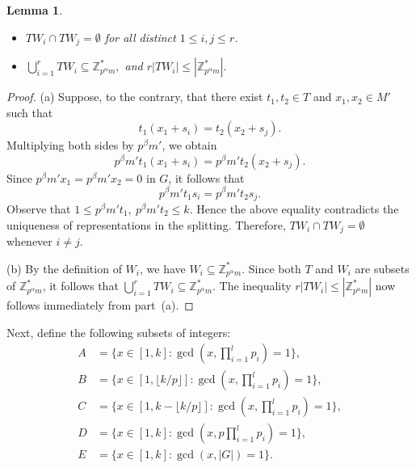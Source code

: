 \documentclass[12pt]{article}
\newtheorem{lemma}[theorem]{Lemma}
\begin{document}
\begin{lemma}\label{lemma--1}
	\begin{itemize}
		\item[(a)] \(TW_i \cap TW_j = \emptyset\) for all distinct \(1 \le i,j \le r\).
		\item[(b)] $\bigcup_{i=1}^{r} TW_i \subseteq \mathbb{Z}_{p^\alpha m}^{*},$
		and  $r|TW_i|\le|\mathbb{Z}_{p^\alpha m}^{*}|.$
	\end{itemize}
\end{lemma}

\begin{proof}
	(a) Suppose, to the contrary, that there exist \(t_1,t_2\in T\) and \(x_1,x_2\in M'\) such that
	\[
	t_1(x_1+s_i)=t_2(x_2+s_j).
	\]
	Multiplying both sides by \(p^\beta m'\), we obtain
	\[
	p^\beta m' t_1(x_1+s_i)
	=
	p^\beta m' t_2(x_2+s_j).
	\]
	Since \(p^\beta m' x_1=p^\beta m' x_2=0\) in \(G\), it follows that
	\[
	p^\beta m' t_1 s_i
	=
	p^\beta m' t_2 s_j.
	\]
	Observe that $1\le p^\beta m' t_1,\ p^\beta m' t_2 \le k.$
	Hence the above equality contradicts the uniqueness of representations in the splitting. Therefore, $TW_i \cap TW_j=\emptyset$
	whenever \(i\ne j\).
	
	(b) By the definition of \(W_i\), we have $W_i\subseteq \mathbb{Z}_{p^\alpha m}^{*}.$
	Since both \(T\) and \(W_i\) are subsets of \(\mathbb{Z}_{p^\alpha m}^{*}\), it follows that $\bigcup_{i=1}^{r} TW_i
	\subseteq\mathbb{Z}_{p^\alpha m}^{*}.$
	The inequality $r|TW_i|\le|\mathbb{Z}_{p^\alpha m}^{*}|$ now follows immediately from part~(a).
\end{proof}

Next, define the following subsets of integers:
\begin{align*}
A &= \{x \in [1,k] : \gcd(x, \textstyle\prod_{i=1}^{l} p_i) = 1\},\\
B &= \{x \in [1,\lfloor k/p \rfloor] : \gcd(x, \textstyle\prod_{i=1}^{l} p_i) = 1\},\\
C &= \{x \in [1, k - \lfloor k/p \rfloor] : \gcd(x, \textstyle\prod_{i=1}^{l} p_i) = 1\},\\
D &= \{x \in [1,k] : \gcd(x, p \textstyle\prod_{i=1}^{l} p_i) = 1\},\\
E &= \{x \in [1,k] : \gcd(x, |G|) = 1\}.
\end{align*}
\end{document}
